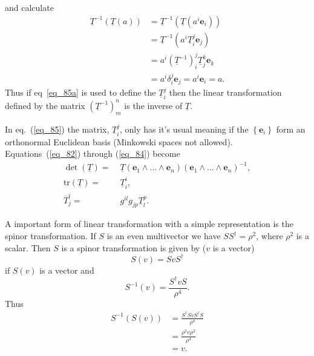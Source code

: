 \documentclass[12pt]{report}
\newcommand{\bm}[1]{\boldsymbol{#1}}
\newcommand{\lp}{\left (}
\newcommand{\rp}{\right )}
\newcommand{\lbrc}{\left \{}
\newcommand{\rbrc}{\right \}}
\newcommand{\set}[1]{\lbrc {#1} \rbrc}
\newcommand{\W}{\wedge}
\newcommand{\R}{\dagger}
\newcommand{\f}[2]{{#1}\lp {#2} \rp}
\newcommand{\paren}[1]{\lp {#1} \rp}
\newcommand{\eb}{\bm{e}}
\newcommand{\tr}{\mbox{tr}}
\begin{document}
and calculate
\begin{align}
	\underline{T}^{-1}\paren{\underline{T}\paren{a}} &= \underline{T}^{-1}\paren{\underline{T}\paren{a^{i}\eb_{i}}} \nonumber \\
		&= \underline{T}^{-1}\paren{a^{i}\underline{T}_{i}^{j}\eb_{j}} \nonumber \\
		&= a^{i}\paren{\underline{T}^{-1}}_{i}^{j} \underline{T}_{j}^{k}\eb_{k} \nonumber \\
		&= a^{i}\delta_{i}^{j}\eb_{j} = a^{i}\eb_{i} = a.
\end{align}
Thus if eq~\ref{eq_85a} is used to define the $\underline{T}_{i}^{j}$ then the linear transformation defined by the matrix $\paren{\underline{T}^{-1}}_{m}^{n}$ is the inverse of $\underline{T}$.

In eq.~(\ref{eq_85}) the matrix, $\underline{T}_{i}^{j}$, only has it's usual meaning if the $\set{\eb_{i}}$ form an orthonormal Euclidean
basis (Minkowski spaces not allowed). Equations~(\ref{eq_82}) through (\ref{eq_84}) become
\begin{align}
    \f{\det}{\underline{T}} =&\; \f{\underline{T}}{\eb_{1}\W\dots\W\eb_{n}}\paren{\eb_{1}\W\dots\W\eb_{n}}^{-1},\\
    \f{\tr}{\underline{T}} =&\; \underline{T}_{i}^{i},\\
    \overline{T}_{j}^{i} =&\;  g^{il}g_{jp}\underline{T}_{l}^{p}.
\end{align}

A important form of linear transformation with a simple representation is the spinor transformation.  If $S$ is an even multivector we have
$SS^{\R} = \rho^{2}$, where $\rho^{2}$ is a scalar.  Then $S$ is a spinor transformation is given by ($v$ is a vector)
\begin{equation}
	\f{S}{v} = SvS^{\R}
\end{equation}
if $\f{S}{v}$ is a vector and
\begin{equation}
	\f{S^{-1}}{v} = \frac{S^{\R}vS}{\rho^{4}}.
\end{equation}
Thus
\begin{align}
	\f{S^{-1}}{\f{S}{v}} &= \frac{S^{\R}SvS^{\R}S}{\rho^{4}} \nonumber \\
	                     &= \frac{\rho^{2}v\rho^{2}}{\rho^{4}} \nonumber \\
	                     &= v. 
\end{align}
\end{document}
